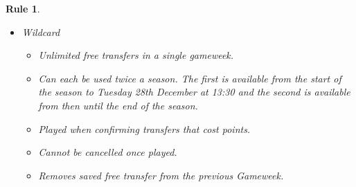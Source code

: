 \documentclass[12pt, a4paper, oneside]{book}
\newtheorem{rules}[theorem]{Rule}
\numberwithin{equation}{section}
\begin{document}
\begin{rules}
\begin{itemize}
\begin{itemize}
      \item Can each be used once a season.
      \item Played when saving your team on the my team page.
      \item Can be cancelled at anytime before the Gameweek deadline.
    \end{itemize}
    \item Wildcard
    \begin{itemize}
      \item Unlimited free transfers in a single gameweek.
      \item Can each be used twice a season. The first is available from the start of the season to Tuesday 28th December at 13:30 and the second is available from then until the end of the season.
      \item Played when confirming transfers that cost points.
      \item Cannot be cancelled once played.
      \item Removes saved free transfer from the previous Gameweek.
    \end{itemize}
  \end{itemize}
\end{rules}
\end{document}
